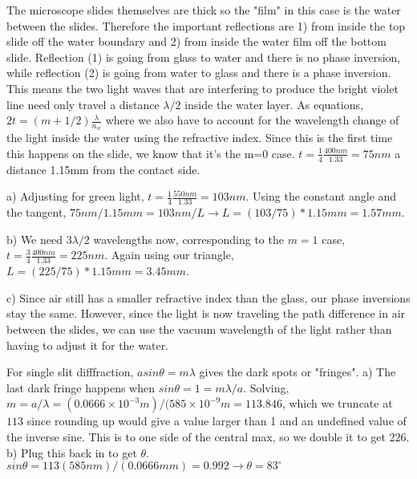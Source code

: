 \documentclass[10pt]{article}
\newenvironment{problem}[2][Problem]{\begin{trivlist}
\item[\hskip \labelsep {\bfseries #1}\hskip \labelsep {\bfseries #2.}]}{\end{trivlist}}
\begin{document}
\begin{problem}{3}
The microscope slides themselves are thick so the "film" in this case is the water between the slides. Therefore the important reflections are 1) from inside the top slide off the water boundary and 2) from inside the water film off the bottom slide. Reflection (1) is going from glass to water and there is no phase inversion, while reflection (2) is going from water to glass and there is a phase inversion. This means the two light waves that are interfering to produce the bright violet line need only travel a distance $\lambda/2$ inside the water layer. As equations, $2t=(m+1/2)\frac{\lambda}{n_w}$ where we also have to account for the wavelength change of the light inside the water using the refractive index. Since this is the first time this happens on the slide, we know that it's the m=0 case. $t=\frac{1}{4}\frac{400nm}{1.33}=75nm$ a distance 1.15mm from the contact side.
\item a) Adjusting for green light, $t=\frac{1}{4}\frac{550nm}{1.33}=103nm$. Using the constant angle and the tangent, $75nm/1.15mm = 103nm/L \xrightarrow{} L=(103/75)*1.15mm=1.57mm$.
\item b) We need $3\lambda/2$ wavelengths now, corresponding to the $m=1$ case, $t=\frac{3}{4}\frac{400nm}{1.33}=225nm$. Again using our triangle, $L=(225/75)*1.15mm=3.45mm$.
\item c) Since air still has a smaller refractive index than the glass, our phase inversions stay the same. However, since the light is now traveling the path difference in air between the slides, we can use the vacuum wavelength of the light rather than having to adjust it for the water.

\end{problem}






\begin{problem}{4}
For single slit difffraction, $asin\theta=m\lambda$ gives the dark spots or "fringes". 
a) The last dark fringe happens when $sin\theta=1 = m\lambda/a$. Solving, $m=a/\lambda=(0.0666\times10^{-3}m)/(585\times10^{-9}m=113.846$, which we truncate at $113$ since rounding up would give a value larger than 1 and an undefined value of the inverse sine. This is to one side of the central max, so we double it to get 226.
b) Plug this back in to get $\theta$. $sin\theta = 113(585nm)/(0.0666mm)=0.992 \xrightarrow{} \theta=83^\circ$
\end{problem}
\end{document}
